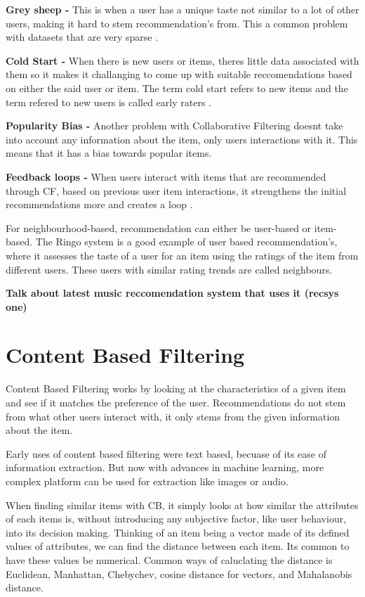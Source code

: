 \textbf{Grey sheep - }This is when a user has a unique taste not similar to a lot of other users, making it hard to stem recommendation's from. This a common problem with datasets that are very sparse \citep{claypool_combining_1999}.

\textbf{Cold Start - } When there is new users or items, theres little data associated with them so it makes it challanging to come up with suitable reccomendations based on either the said user or item. The term cold start refers to new items and the term refered to new users is called early raters \citep{avery_recommender_1997}.

\textbf{Popularity Bias - } Another problem with Collaborative Filtering doesnt take into account any information about the item, only users interactions with it. This means that it has a bias towards popular items.

\textbf{Feedback loops - } When users interact with items that are recommended through CF, based on previous user item interactions, it strengthens the initial recommendations more and creates a loop \citep{sanchez-moreno_incorporating_2018}.


For neighbourhood-based, recommendation can either be user-based or item-based. The Ringo system is a good example of user based recommendation's, where it assesses the taste of a user for an item using the ratings of the item from different users. These users with similar rating trends are called neighbours. 

\textbf{Talk about latest music reccomendation system that uses it (recsys one)}
\section{Content Based Filtering}

Content Based Filtering works by looking at the characteristics of a given item and see if it matches the preference of the user. Recommendations do not stem from what other users interact with, it only stems from the given information about the item.

Early uses of content based filtering were text based, becuase of its ease of information extraction. But now with advances in machine learning, more complex platform can be used for extraction like images or audio.

When finding similar items with CB, it simply looks at how similar the attributes of each items is, without introducing any subjective factor, like user behaviour, into its decision making. Thinking of an item being a vector made of its defined values of attributes, we can find the distance between each item. Its common to have these values be numerical. Common ways of caluclating the distance is Euclidean, Manhattan, Chebychev, cosine distance for vectors, and Mahalanobis distance.

